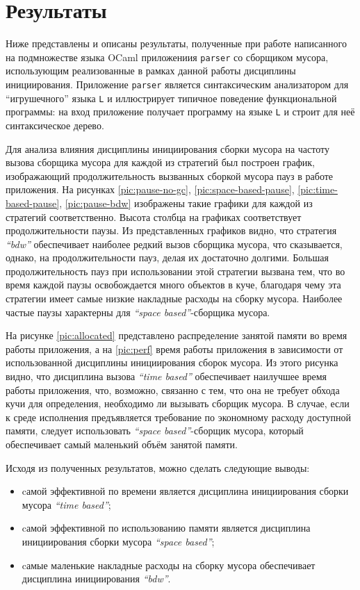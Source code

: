 \section{Результаты}

Ниже представлены и описаны результаты, полученные при работе написанного на 
подмножестве языка OCaml приложениия \texttt{parser} со сборщиком мусора,
использующим реализованные в рамках данной работы дисциплины инициирования.
Приложение \texttt{parser} является
синтаксическим анализатором для ``игрушечного'' языка \texttt{L} и иллюстрирует типичное
поведение функциональной программы: на вход приложение получает программу на языке 
\texttt{L}
и строит для неё синтаксическое дерево. 


Для анализа влияния дисциплины инициирования сборки мусора на частоту вызова сборщика
мусора для каждой из стратегий был построен график, изображающий продолжительность 
вызванных сборкой мусора пауз в 
работе приложения. На рисунках \ref{pic:pause-no-gc},
\ref{pic:space-based-pause}, \ref{pic:time-based-pause}, \ref{pic:pause-bdw} 
изображены такие графики для каждой из стратегий соответственно. Высота столбца на графиках
соответствует продолжительности паузы. Из представленных графиков видно, что
стратегия \emph{``bdw''} обеспечивает наиболее редкий вызов сборщика мусора, что сказывается,
однако, на продолжительности пауз, делая их достаточно долгими. 
Большая продолжительность пауз при использовании этой стратегии вызвана
тем, что во время каждой паузы освобождается много объектов в куче,
благодаря чему эта стратегии имеет самые низкие накладные расходы на сборку
мусора. Наиболее частые паузы характерны для \emph{``space based''}-сборщика мусора. 

На рисунке \ref{pic:allocated} представлено распределение занятой памяти во время работы 
приложения, а на \ref{pic:perf} время работы приложения в зависимости
от использованной дисциплины инициирования сборок мусора. Из этого рисунка видно, что дисциплина вызова 
\emph{``time based''} обеспечивает наилучшее время работы приложения, что, возможно,
связанно с тем, что она не требует обхода кучи для определения, необходимо 
ли вызывать сборщик мусора. В случае, если к среде исполнения предъявляется требование
по экономному расходу доступной памяти, следует использовать \emph{``space based''}-сборщик
мусора, который обеспечивает самый маленький объём занятой памяти.

Исходя из полученных результатов, можно сделать следующие выводы:
\begin{itemize}
\item cамой эффективной по времени является дисциплина инициирования сборки мусора
\emph{``time based''};
\item cамой эффективной по использованию памяти является дисциплина инициирования
сборки мусора \emph{``space based''};
\item cамые маленькие накладные расходы на сборку мусора обеспечивает
дисциплина инициирования \emph{``bdw''}.
\end{itemize}


